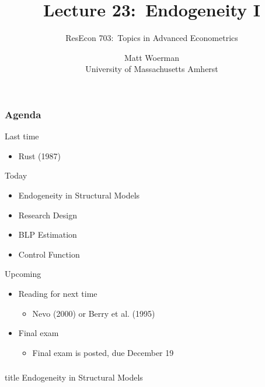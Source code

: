 \documentclass{beamer}
\title[Lecture 23:\ Endogeneity I]{Lecture 23:\ Endogeneity I}
\author[ResEcon 703:\ Advanced Econometrics]{ResEcon 703:\ Topics in Advanced Econometrics}
\date{Matt Woerman\\University of Massachusetts Amherst}
\begin{document}
{ 
\begin{frame}[noframenumbering]
    \titlepage
\end{frame}
}

\begin{frame}\frametitle{Agenda}
    Last time
    \begin{itemize}
        \item Rust (1987)
    \end{itemize}
    \vspace{2ex}
    Today
    \begin{itemize}
    	\item Endogeneity in Structural Models
    	\item Research Design
    	\item BLP Estimation
    	\item Control Function
    \end{itemize}
    \vspace{2ex}
    Upcoming
    \begin{itemize}
        \item Reading for next time
        \begin{itemize}
            \item Nevo (2000) or Berry et al. (1995)
        \end{itemize}
        \item Final exam
        \begin{itemize}
            \item Final exam is posted, due December 19
        \end{itemize}
    \end{itemize}
\end{frame}

\begin{frame}\frametitle{}
    \vfill
    \centering
    \begin{beamercolorbox}[center]{title}
        \Large Endogeneity in Structural Models
    \end{beamercolorbox}
    \vfill
\end{frame}
\end{document}

